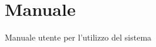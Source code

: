 \chapter{Manuale}
\label{appendixD}
\thispagestyle{empty}

\noindent Manuale utente per l'utilizzo del sistema